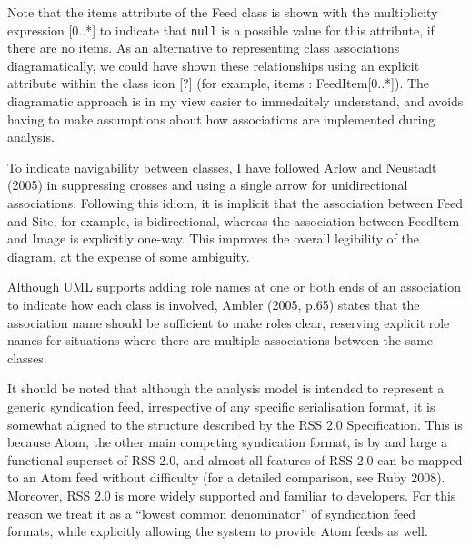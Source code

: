 \documentclass[a4paper]{article}
\begin{document}
Note that the \textsf{items} attribute of the \textsf{Feed} class is shown with the multiplicity expression \textsf{[0..*]} to indicate that \texttt{null} is a possible value for this attribute, if there are no items. As an alternative to representing class associations diagramatically, we could have shown these relationships using an explicit attribute within the class icon [?] (for example, \textsf{items : FeedItem[0..*]}). The diagramatic approach is in my view easier to immedaitely understand, and avoids having to make assumptions about how associations are implemented during analysis.

To indicate navigability between classes, I have followed Arlow and Neustadt (2005) in suppressing crosses and using a single arrow for unidirectional associations. Following this idiom, it is implicit that the association between \textsf{Feed} and \textsf{Site}, for example, is bidirectional, whereas the association between \textsf{FeedItem} and \textsf{Image} is explicitly one-way. This improves the overall legibility of the diagram, at the expense of some ambiguity.

Although UML supports adding role names at one or both ends of an association to indicate how each class is involved, Ambler (2005, p.65) states that the association name should be sufficient to make roles clear, reserving explicit role names for situations where there are multiple associations between the same classes.

It should be noted that although the analysis model is intended to represent a generic syndication feed, irrespective of any specific serialisation format, it is somewhat aligned to the structure described by the RSS 2.0 Specification\cite{rss}. This is because Atom, the other main competing syndication format, is by and large a functional superset of RSS 2.0, and almost all features of RSS 2.0 can be mapped to an Atom feed without difficulty (for a detailed comparison, see Ruby 2008). Moreover, RSS 2.0 is more widely supported and familiar to developers. For this reason we treat it as a ``lowest common denominator'' of syndication feed formats, while explicitly allowing the system to provide Atom feeds as well.


\end{document}
